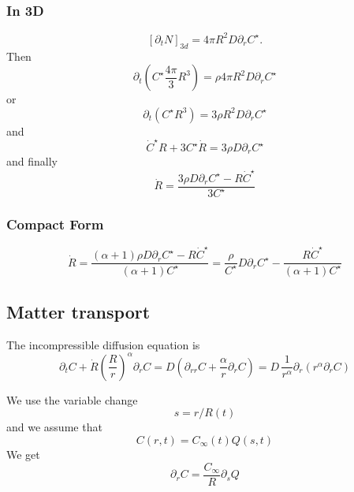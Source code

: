 \documentclass[11pt]{revtex4}
\begin{document}
\subsubsection{In 3D}
\begin{equation}
	\left[\partial_t N\right]_{3d} =  4\pi R^2 D \partial_r C^\star.
\end{equation}
Then
\begin{equation}
	\partial_t\left( C^\star \dfrac{4\pi}{3} R^3 \right) = \rho   4\pi R^2 D \partial_r C^\star
\end{equation}
or
\begin{equation}
	\partial_t\left( C^\star R^3\right) = 3\rho R^2 D \partial_r C^\star
\end{equation}
and
\begin{equation}
	\dot{C}^\star R + 3 C^\star \dot{R}  = 3\rho  D \partial_r C^\star
\end{equation}
and finally
\begin{equation}
	\dot{R} = \dfrac{3\rho  D \partial_r C^\star - R\dot{C}^\star}{3C^\star}
\end{equation}

\subsubsection{Compact Form}
\begin{equation}
	\dot{R} = \dfrac{(\alpha+1)\rho  D \partial_r C^\star - R\dot{C}^\star}{(\alpha+1)C^\star} = \dfrac{\rho}{C^\star} D\partial_rC^\star - \dfrac{R\dot{C}^\star}{\left(\alpha+1\right)C^\star}
\end{equation}

\subsection{Matter transport}
The incompressible diffusion equation is
\begin{equation}
	\partial_t C + \dot{R} \left(\dfrac{R}{r}\right)^\alpha  \partial_r C = D \left( \partial_{rr} C + \dfrac{\alpha}{r} \partial_r C \right) = D \, \dfrac{1}{r^\alpha} \partial_r \left(r^\alpha\partial_r C\right)
\end{equation}

We use the variable change 
\begin{equation}
	s = r / R(t)
\end{equation}
and we assume that
\begin{equation}
	C(r,t) = C_\infty(t) Q\left(s,t\right)
\end{equation}
We get
\begin{equation}
	\partial_r C = \dfrac{C_\infty}{R} \partial_s Q 
\end{equation}
\end{document}
